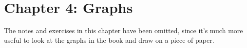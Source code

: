 \documentclass{article}
\begin{document}
\section{Chapter 4: Graphs}

The notes and exercises in this chapter have been omitted, since it's much more useful to look at the graphs in the book and draw on a piece of paper.
\end{document}
